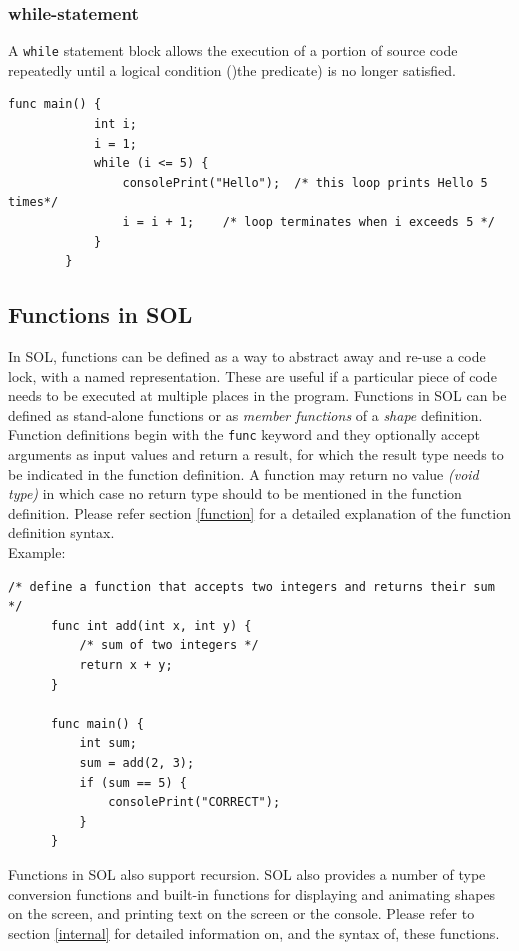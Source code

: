 \documentclass[letterpaper,12pt]{report}
\begin{document}
      \subsubsection{while-statement}
      A \texttt{while} statement block allows the execution of a portion of source code repeatedly until a logical condition ()the predicate) is no longer satisfied.
      \begin{lstlisting}[style=sol]
        func main() {
            int i;
            i = 1;
            while (i <= 5) {
                consolePrint("Hello");  /* this loop prints Hello 5 times*/
                i = i + 1;    /* loop terminates when i exceeds 5 */
            }
        }
      \end{lstlisting}

    \subsection{Functions in SOL}
    In SOL, functions can be defined as a way to abstract away and re-use a code lock, with a named representation. These are useful if a particular piece of code needs to be executed at multiple places in the program. Functions in SOL can be defined as stand-alone functions or as \textit{member functions} of a \textit{shape} definition. Function definitions begin with the \texttt{func} keyword and they optionally accept arguments as input values and return a result, for which the result type needs to be indicated in the function definition. A function may return no value \textit{(void type)} in which case no return type should to be mentioned in the function definition. Please refer section \ref{function} for a detailed explanation of the function definition syntax.\\
    
    Example:\\
    \begin{lstlisting}[style=sol]
      /* define a function that accepts two integers and returns their sum */
      func int add(int x, int y) {
          /* sum of two integers */
          return x + y;
      }

      func main() {
          int sum;
          sum = add(2, 3);
          if (sum == 5) {
              consolePrint("CORRECT");
          }
      }
    \end{lstlisting}

    Functions in SOL also support recursion. SOL also provides a number of type conversion functions and built-in functions for displaying and animating shapes on the screen, and printing text on the screen or the console. Please refer to section \ref{internal} for detailed information on, and the syntax of, these functions.
\end{document}

